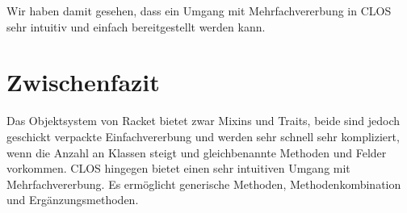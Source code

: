 % 
% 
% 
% 
% 
% 
% 

Wir haben damit gesehen, dass ein Umgang mit Mehrfachvererbung in CLOS sehr intuitiv und einfach bereitgestellt werden kann.

\section{Zwischenfazit}
Das Objektsystem von Racket bietet zwar Mixins und Traits, beide sind jedoch geschickt verpackte Einfachvererbung und werden sehr schnell sehr kompliziert, wenn die Anzahl an Klassen steigt und gleichbenannte Methoden und Felder vorkommen. CLOS hingegen bietet einen sehr intuitiven Umgang mit Mehrfachvererbung. Es ermöglicht generische Methoden, Methodenkombination und Ergänzungsmethoden.
